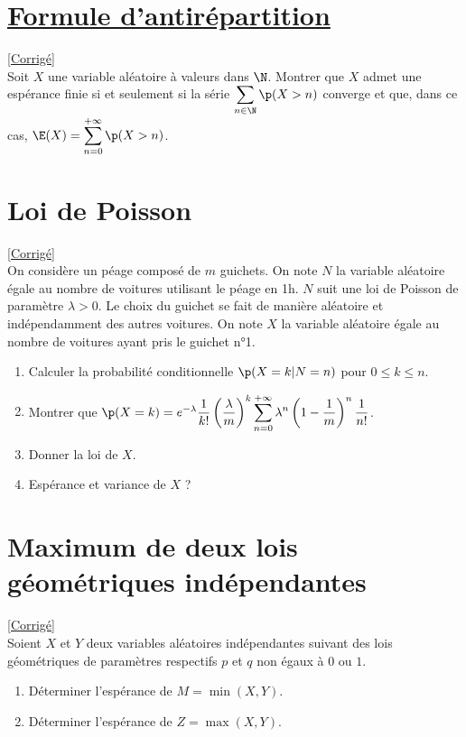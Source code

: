 \documentclass[8pt]{book}
\begin{document}
\section{\underline{Formule d'antirépartition} }
\label{Formule d'antirépartition}
\textcolor{blue}{\hyperref[Formule d'antirépartition corrigé]{[Corrigé]}}\\
Soit $X$ une variable aléatoire à valeurs dans $\N$. Montrer que $X$ admet une espérance finie si et seulement si la série $\displaystyle\sum\limits_{n\in \N}\p(X>n)$ converge et que, dans ce cas, $\E(X)=\displaystyle\sum\limits_{n=0}^{+\infty}\p(X>n)$.

\section{Loi de Poisson }
\label{Loi de Poisson}
\textcolor{blue}{\hyperref[Loi de Poisson corrigé]{[Corrigé]}}\\
On considère un péage composé de $m$ guichets. On note $N$ la variable aléatoire égale au nombre de voitures utilisant le péage en 1h. $N$ suit une loi de Poisson de paramètre $\lambda>0$. Le choix du guichet se fait de manière aléatoire et indépendamment des autres voitures. On note $X$ la variable aléatoire égale au nombre de voitures ayant pris le guichet n°1.
\begin{enumerate}
	\item Calculer la probabilité conditionnelle $\p(X=k|N=n)$ pour $0\leq k \leq n$.
	\item Montrer que $\p(X=k)=e^{-\lambda}\displaystyle\frac{1}{k!}\left( \frac{\lambda}{m}\right)^k\sum\limits_{n=0}^{+\infty}\lambda^n\left(1-\frac{1}{m}\right)^n\frac{1}{n!}$.
	\item Donner la loi de $X$.
	\item Espérance et variance de $X$ ?
\end{enumerate}

\section{Maximum de deux lois géométriques indépendantes }
\label{Maximum de deux lois géométriques indépendantes}
\textcolor{blue}{\hyperref[Maximum de deux lois géométriques indépendantes corrigé]{[Corrigé]}}\\
Soient $X$ et $Y$ deux variables aléatoires indépendantes suivant des lois géométriques de paramètres respectifs $p$ et $q$ non égaux à $0$ ou $1$.
\begin{enumerate}
	\item Déterminer l'espérance de $M=\min(X,Y)$.
	\item Déterminer l'espérance de $Z=\max(X,Y)$.
\end{enumerate}
\end{document}
